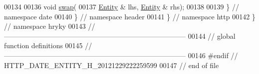 \begin{DoxyCode}
00134 
00136     \textcolor{keywordtype}{void} \hyperlink{namespacehryky_1_1http_a38e62595ad532d18fbc65ceb61973aec}{swap}(
00137         \hyperlink{classhryky_1_1http_1_1header_1_1date_1_1_entity}{Entity} & lhs, \hyperlink{classhryky_1_1http_1_1header_1_1date_1_1_entity}{Entity} & rhs);
00138 
00139 \} \textcolor{comment}{// namespace date}
00140 \} \textcolor{comment}{// namespace header}
00141 \} \textcolor{comment}{// namespace http}
00142 \} \textcolor{comment}{// namespace hryky}
00143 \textcolor{comment}{//
      ------------------------------------------------------------------------------}
00144 \textcolor{comment}{// global function definitions}
00145 \textcolor{comment}{//
      ------------------------------------------------------------------------------}
00146 \textcolor{preprocessor}{#endif // HTTP\_DATE\_ENTITY\_H\_20121229222259599}
00147 \textcolor{preprocessor}{}\textcolor{comment}{// end of file}
\end{DoxyCode}
